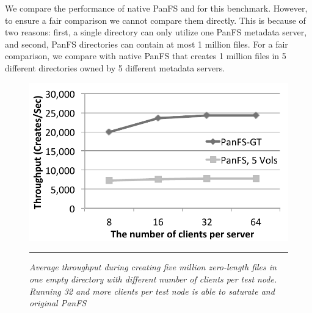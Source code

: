 We compare the performance of native PanFS and \psys for this benchmark.
However, to ensure a fair comparison we cannot compare them directly. This is
because of two reasons: first, a single directory can only utilize one PanFS 
metadata server, and second, PanFS directories can contain at most 1 million 
files.
For a fair comparison, we compare \psys with native PanFS that creates 1 million 
files in 5 different directories owned by 5 different metadata servers.

\begin{figure}[t]  %
\centerline{\includegraphics[scale=0.7]{./figs/zero_file_creation_on_panfs}}
\vspace{10pt}
\caption{
\textit{Average throughput during creating five million zero-length files
in one empty directory with different number of clients per test node.
Running 32 and more clients per test node is able to saturate \psys
and original PanFS}
}
\hrule
\label{graph:creation_clients}
\end{figure}       %

